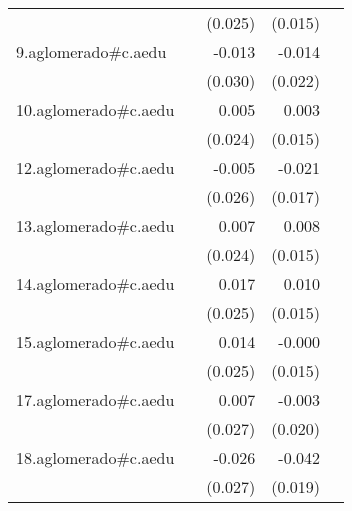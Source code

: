 {\begin{longtable}{l*{4}{D{.}{.}{-1}}}
            &                     &     (0.025)         &     (0.015)         &                     \\
\addlinespace
9.aglomerado#c.aedu&                     &      -0.013         &      -0.014         &                     \\
            &                     &     (0.030)         &     (0.022)         &                     \\
\addlinespace
10.aglomerado#c.aedu&                     &       0.005         &       0.003         &                     \\
            &                     &     (0.024)         &     (0.015)         &                     \\
\addlinespace
12.aglomerado#c.aedu&                     &      -0.005         &      -0.021         &                     \\
            &                     &     (0.026)         &     (0.017)         &                     \\
\addlinespace
13.aglomerado#c.aedu&                     &       0.007         &       0.008         &                     \\
            &                     &     (0.024)         &     (0.015)         &                     \\
\addlinespace
14.aglomerado#c.aedu&                     &       0.017         &       0.010         &                     \\
            &                     &     (0.025)         &     (0.015)         &                     \\
\addlinespace
15.aglomerado#c.aedu&                     &       0.014         &      -0.000         &                     \\
            &                     &     (0.025)         &     (0.015)         &                     \\
\addlinespace
17.aglomerado#c.aedu&                     &       0.007         &      -0.003         &                     \\
            &                     &     (0.027)         &     (0.020)         &                     \\
\addlinespace
18.aglomerado#c.aedu&                     &      -0.026         &      -0.042\sym{*}  &                     \\
            &                     &     (0.027)         &     (0.019)         &                     \\

\end{longtable}}
